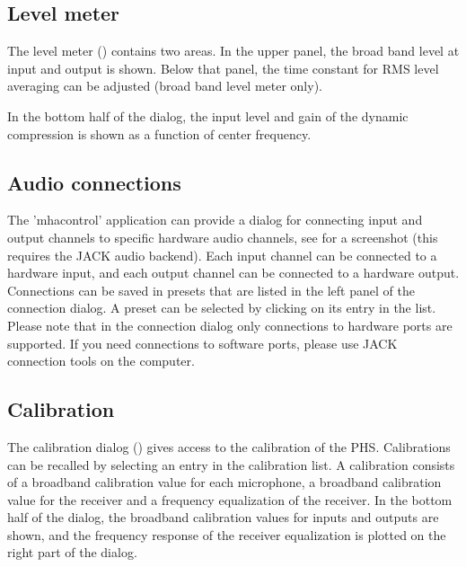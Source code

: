 \documentclass[11pt,a4paper,twoside]{article}
\newcommand{\+}{\discretionary{\mbox{\scriptsize$\hookleftarrow$}}{}{}}
\begin{document}
\subsection{Level meter}\label{sec:levels}

The level meter () contains two areas.
%
In the upper panel, the broad band level at input and output is shown.
%
Below that panel, the time constant for RMS level averaging can be
adjusted (broad band level meter only).

In the bottom half of the dialog, the input level and gain of the
dynamic compression is shown as a function of center frequency.


\subsection{Audio connections}\label{sec:audioconnections}

The 'mhacontrol' application can provide a dialog for connecting input
and output channels to specific hardware audio channels, see
 for a screenshot (this
requires the JACK audio backend).
%
Each \mha{} input channel can be connected to a hardware input, and
each output channel can be connected to a hardware output.
%
Connections can be saved in presets that are listed in the left panel of the connection dialog.
%
A preset can be selected by clicking on its entry in the list.
%
Please note that in the connection dialog only connections to hardware
ports are supported.
%
If you need connections to software ports, please use JACK connection
tools on the \mha{} computer.
%


\subsection{Calibration}\label{sec:calibration}

The calibration dialog () gives access
to the calibration of the PHS.
%
Calibrations can be recalled by selecting an entry in the calibration
list.
%
A calibration consists of a broadband calibration value for each
microphone, a broadband calibration value for the receiver and a
frequency equalization of the receiver.
%
In the bottom half of the dialog, the broadband calibration values for
inputs and outputs are shown, and the frequency response of the
receiver equalization is plotted on the right part of the dialog.
\end{document}
